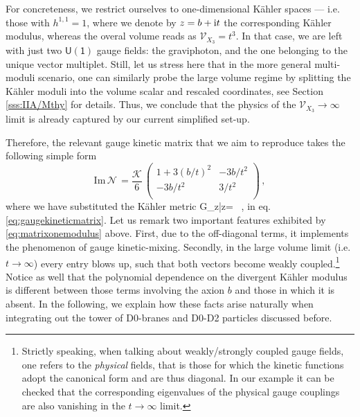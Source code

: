 For concreteness, we restrict ourselves to one-dimensional K\"ahler spaces --- i.e. those with $h^{1,1}=1$, where we denote by $z=b+\text{i} t$ the corresponding K\"ahler modulus, whereas the overal volume reads as $\mathcal{V}_{X_3}=t^3$. In that case, we are left with just two $\mathsf{U(1)}$ gauge fields: the graviphoton, and the one belonging to the unique vector multiplet. Still, let us stress here that in the more general multi-moduli scenario, one can similarly probe the large volume regime by splitting the K\"ahler moduli into the volume scalar and rescaled coordinates, see Section \ref{sss:IIA/Mthy} for details. Thus, we conclude that the physics of the $\mathcal{V}_{X_3}\to \infty$ limit is already captured by our current simplified set-up.
		
Therefore, the relevant gauge kinetic matrix that we aim to reproduce takes the following simple form
%
\begin{equation} \label{eq:matrixonemodulus}
	\text{Im}\, \mathcal{N}\, = \frac{\mathcal{K}}{6} \, \left(
		\begin{array}{cc}
			1+3(b/t)^2 & -3b/t^2  \\
			-3b/t^2 & 3/t^2  \\
		\end{array}
	\right) \, ,
\end{equation}
%
where we have substituted the K\"ahler metric 
%
\beq
		G_{z\bar z}= \, ,
\eeq
%
in eq. \eqref{eq:gaugekineticmatrix}. Let us remark two important features exhibited by \eqref{eq:matrixonemodulus} above. First, due to the off-diagonal terms, it implements the phenomenon of gauge kinetic-mixing\cite{Holdom:1985ag,delAguila:1988jz}. Secondly, in the large volume limit (i.e. $t \to \infty$) every entry blows up, such that both vectors become weakly coupled.\footnote{Strictly speaking, when talking about weakly/strongly coupled gauge fields, one refers to the \emph{physical} fields, that is those for which the kinetic functions adopt the canonical form and are thus diagonal. In our example it can be checked that the corresponding eigenvalues of the physical gauge couplings are also vanishing in the $t \to \infty$ limit.} Notice as well that the polynomial dependence on the divergent K\"ahler modulus is different between those terms involving the axion $b$ and those in which it is absent. In the following, we explain how these facts arise naturally when integrating out the tower of D0-branes and D0-D2 particles discussed before.
		 
